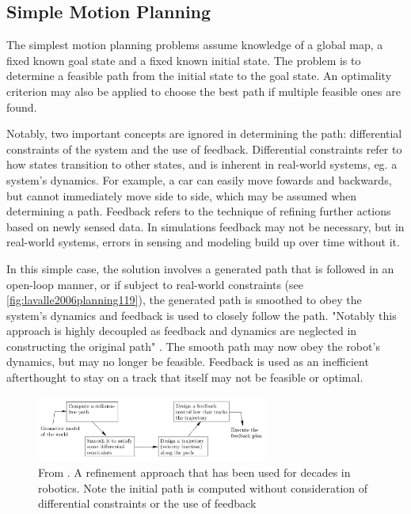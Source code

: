\subsection{Simple Motion Planning}
The simplest motion planning problems assume knowledge of a global map, a fixed
known goal state and a fixed known initial state. The problem is to determine a
feasible path from the initial state to the goal state. An optimality criterion
may also be applied to choose the best path if multiple feasible ones are found.

Notably, two important concepts are ignored in determining the path:
differential constraints of the system and the use of feedback. Differential
constraints refer to how states transition to other states, and is inherent in
real-world systems, eg. a system's dynamics. For example, a car can easily move
fowards and backwards, but cannot immediately move side to side, which may be
assumed when determining a path. Feedback refers to the technique of refining
further actions based on newly sensed data. In simulations feedback may not be
necessary, but in real-world systems, errors in sensing and modeling build up
over time without it.

In this simple case, the solution involves a generated path that is followed in
an open-loop manner, or if subject to real-world constraints (see
\autoref{fig:lavalle2006planning119}), the generated path is smoothed to obey
the system's dynamics and feedback is used to closely follow the path. "Notably
this approach is highly decoupled as feedback and dynamics are neglected in
constructing the original path" \cite{lavalle2006planning}. The smooth path may
now obey the robot's dynamics, but may no longer be feasible. Feedback is used
as an inefficient afterthought to stay on a track that itself may not be
feasible or optimal.

\begin{figure}
\centering
\includegraphics[width=3in]{figures/lavalle2006planning119.png}
\caption{From \cite{lavalle2006planning}. A refinement approach that has been
used for decades in robotics. Note the initial path is computed without
consideration of differential constraints or the use of feedback}
\label{fig:lavalle2006planning119}
\end{figure}

